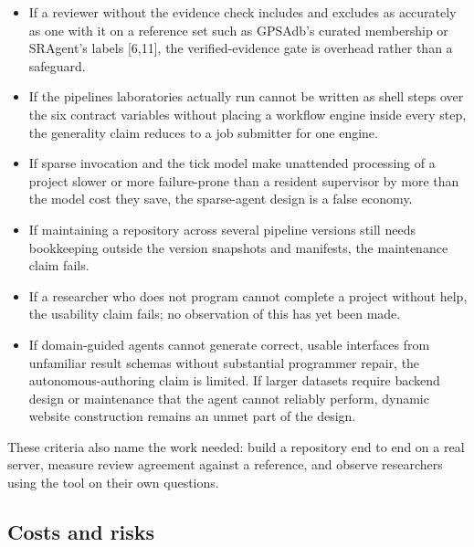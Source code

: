\documentclass[11pt,a4paper]{article}
\providecommand{\tightlist}{\setlength{\itemsep}{0pt}\setlength{\parskip}{0pt}}
\begin{document}
\begin{itemize}
\tightlist
\item
  If a reviewer without the evidence check includes and excludes as
  accurately as one with it on a reference set such as GPSAdb's curated
  membership or SRAgent's labels {[}6,11{]}, the verified-evidence gate
  is overhead rather than a safeguard.
\item
  If the pipelines laboratories actually run cannot be written as shell
  steps over the six contract variables without placing a workflow
  engine inside every step, the generality claim reduces to a job
  submitter for one engine.
\item
  If sparse invocation and the tick model make unattended processing of
  a project slower or more failure-prone than a resident supervisor by
  more than the model cost they save, the sparse-agent design is a false
  economy.
\item
  If maintaining a repository across several pipeline versions still
  needs bookkeeping outside the version snapshots and manifests, the
  maintenance claim fails.
\item
  If a researcher who does not program cannot complete a project without
  help, the usability claim fails; no observation of this has yet been
  made.
\item
  If domain-guided agents cannot generate correct, usable interfaces
  from unfamiliar result schemas without substantial programmer repair,
  the autonomous-authoring claim is limited. If larger datasets require
  backend design or maintenance that the agent cannot reliably perform,
  dynamic website construction remains an unmet part of the design.
\end{itemize}

These criteria also name the work needed: build a repository end to end
on a real server, measure review agreement against a reference, and
observe researchers using the tool on their own questions.

\subsection{Costs and risks}\label{costs-and-risks}
\end{document}
